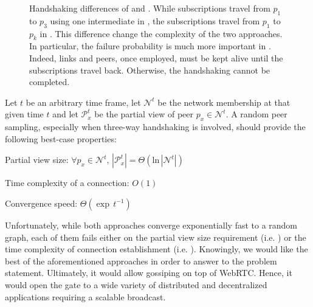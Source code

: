 \begin{figure}
  \centering
  
  \caption{\label{fig:handshakeexample}Handshaking differences of \CYCLON{} and
    \SCAMP{}. While subscriptions travel from $p_1$ to $p_3$ using one
    intermediate in \CYCLON{}, the subscriptions travel from $p_1$ to $p_k$ in
    \SCAMP{}. This difference change the complexity of the two approaches. In
    particular, the failure probability is much more important in
    \SCAMP{}. Indeed, links and peers, once employed, must be kept alive until
    the subscriptions travel back. Otherwise, the handshaking cannot be
    completed.}
\end{figure}

\begin{problem}
  Let $t$ be an arbitrary time frame, let $\mathcal{N}^t$ be the network
  membership at that given time $t$ and let $\mathcal{P}_x^t$ be the partial view of peer $p_x \in \mathcal{N}^t$. 
  A random peer sampling, especially when three-way handshaking is involved, should provide the following best-case properties:
  \begin{center}
    Partial view size: \hfill
    $\forall p_x \in \mathcal{N}^t,\, |\mathcal{P}_x^t| = \Theta (\text{ln}\,
    |\mathcal{N}^t|)$
  \end{center}
  \begin{center}
    Time complexity of a connection: \hfill $O(1)$
  \end{center}
  \begin{center}
    Convergence speed: \hfill $\Theta(\exp \, t^{-1})$
  \end{center}
\end{problem}

Unfortunately, while both approaches converge exponentially fast to a random
graph, each of them fails either on the partial view size requirement
(i.e. \CYCLON{}) or the time complexity of connection establishment
(i.e. \SCAMPLON{}). Knowingly, we would like the best of the aforementioned
approaches in order to answer to the problem statement. Ultimately, it would
allow gossiping on top of WebRTC. Hence, it would open the gate to a wide
variety of distributed and decentralized applications requiring a scalable
broadcast.


